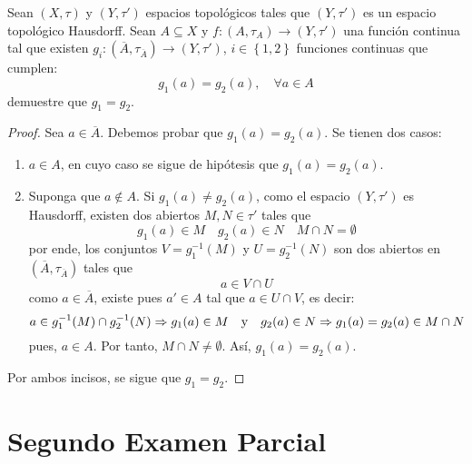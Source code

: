 \documentclass[12pt]{report}
\theoremstyle{largebreak}
\newcommand\cf[3]{\ensuremath{#1:#2\rightarrow#3}}
\newcommand{\Cls}[1]{\ensuremath{\overline{#1}}}
\begin{document}
    \begin{excer}
        Sean $(X,\tau)$ y $(Y,\tau')$ espacios topológicos tales que $(Y,\tau')$ es un espacio topológico Hausdorff. Sean $A\subseteq X$ y $\cf{f}{(A,\tau_A)}{(Y,\tau')}$ una función continua tal que existen $\cf{g_i}{(\Cls{A},\tau_{\Cls{A}})}{(Y,\tau')}$, $i\in\left\{1,2 \right\}$ funciones continuas que cumplen:
        \begin{equation*}
            g_1(a)=g_2(a),\quad\forall a\in A
        \end{equation*}
        demuestre que $g_1=g_2$.
    \end{excer}

    \begin{proof}
        Sea $a\in\Cls{A}$. Debemos probar que $g_1(a)=g_2(a)$. Se tienen dos casos:
        \begin{enumerate}
            \item $a\in A$, en cuyo caso se sigue de hipótesis que $g_1(a)=g_2(a)$.
            \item Suponga que $a\notin A$. Si $g_1(a)\neq g_2(a)$, como el espacio $(Y,\tau')$ es Hausdorff, existen dos abiertos $M,N\in\tau'$ tales que
            \begin{equation*}
                g_1(a)\in M\quad g_2(a)\in N\quad M\cap N=\emptyset
            \end{equation*}
            por ende, los conjuntos $V=g_1^{-1}(M)$ y $U=g_2^{-1}(N)$ son dos abiertos en $(\Cls{A},\tau_{\Cls{A}})$ tales que
            \begin{equation*}
                a\in V\cap U
            \end{equation*}
            como $a\in\Cls{A}$, existe pues $a'\in A$ tal que $a\in U\cap V$, es decir:
            \begin{equation*}
                a\in g_1^{-1}(M)\cap g_2^{-1}(N)\Rightarrow g_1(a)\in M\quad\textup{y}\quad g_2(a)\in N\Rightarrow g_1(a)=g_2(a)\in M\cap N
            \end{equation*}
            pues, $a\in A$. Por tanto, $M\cap N\neq\emptyset$. Así, $g_1(a)=g_2(a)$.
        \end{enumerate}
        Por ambos incisos, se sigue que $g_1=g_2$.
    \end{proof}

    \chapter{Segundo Examen Parcial}
\end{document}
